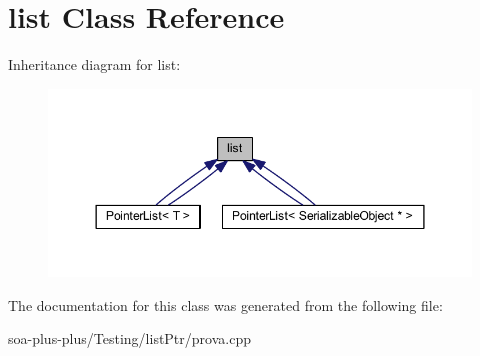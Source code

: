 \hypertarget{classlist}{
\section{list Class Reference}
\label{classlist}
}


Inheritance diagram for list:\nopagebreak
\begin{figure}[H]
\begin{center}
\leavevmode
\includegraphics[width=351pt]{classlist__inherit__graph}
\end{center}
\end{figure}


The documentation for this class was generated from the following file:\begin{DoxyCompactItemize}
\item 
soa-\/plus-\/plus/Testing/listPtr/prova.cpp\end{DoxyCompactItemize}
